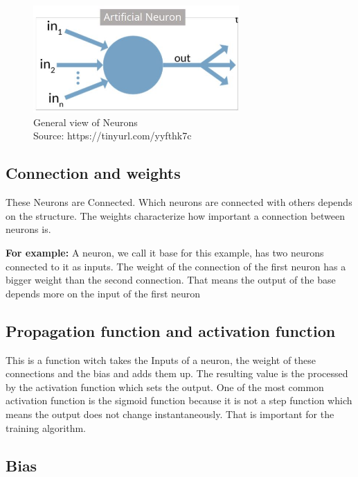 \begin{figure}[h]
	\centering
	\includegraphics[width=0.7\textwidth]{./media/images/diagram-for-general-view-of-artificial-neuron.jpg}
  	\caption{General view of Neurons
  	\\Source: https://tinyurl.com/yyfthk7c}
  	\label{Gvon}
\end{figure}

\subsection{Connection and weights}

These Neurons are Connected. Which neurons are connected with others depends on the structure. The weights characterize how important a connection between neurons is. 

\textbf{For example:}\newline
A neuron, we call it base for this example, has two neurons connected to it as inputs. The weight of the connection of the first neuron has a bigger weight than the second connection. That means the output of the base depends more on the input of the first neuron 

\subsection{Propagation function  and activation function}

This is a function witch takes the Inputs of a neuron, the weight of these connections and the bias and adds them up. The resulting value is the processed by the activation function which sets the output. One of the most common activation function is the sigmoid function because it is not a step function which means the output does not  change instantaneously. That is important for the training algorithm.

\subsection{Bias}

